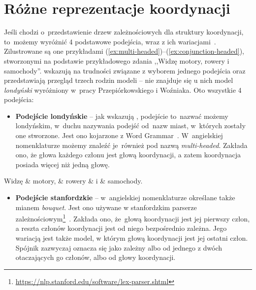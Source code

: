 \documentclass[licencjacka]{pracamgr_Kogni}
\begin{document}
    \section{Różne reprezentacje koordynacji}\label{sec:rozne-reprezentacje-koordynacji}
    Jeśli chodzi o~przedstawienie drzew zależnościowych dla struktury koordynacji, to~możemy wyróżnić 4 podstawowe podejścia, wraz z ich wariacjami~\citep{PopelEtAl2013, Przepiorkowski2023}.
    Zilustrowane są one przykładami (\ref{ex:multi-headed})--(\ref{ex:conjunction-headed}), stworzonymi na podstawie przykładowego zdania ,,Widzę motory, rowery i samochody''.
    \citet{PopelEtAl2013} wskazują na trudności związane z wyborem jednego podejścia oraz przedstawiają przegląd trzech rodzin modeli -- nie znajduje się u nich model \textit{londyński} wyróżniony w~pracy Przepiórkowskiego i Woźniaka.
    Oto wszystkie 4 podejścia:\\
    \begin{itemize}
        \item\textbf{Podejście londyńskie} -- jak wskazują \citet{Przepiorkowski2023}, podejście to~nazwać możemy londyńskim, w~duchu nazywania podejść od~nazw miast, w~których zostały one stworzone.
        Jest ono kojarzone z Word Grammar~\citep{Hudson1984, Hudson1990, Hudson2010}.
        W~angielskiej nomenklaturze możemy znaleźć je~również pod nazwą \textit{multi-headed}.
        Zakłada ono, że głowa każdego członu jest głową koordynacji, a zatem koordynacja posiada więcej niż jedną głowę.
    \end{itemize}
    \begin{exe}
        \ex
        \begin{dependency}[theme = simple, group style = bubble, segmented edge, edge vertical padding=0.5ex, edge unit distance=1.2ex, baseline =3em]
            \centering
            \begin{deptext}[column sep=1cm]
                Widzę \& motory, \& rowery \& i \& samochody. \\
            \end{deptext}
        \end{dependency}
        \label{ex:multi-headed}
    \end{exe}
    \begin{itemize}
        \item\textbf{Podejście stanfordzkie} -- w~angielskiej nomenklaturze określane także mianem \textit{bouquet}.
        Jest ono używane w stanfordzkim parserze zależnościowym\footnote{\url{https://nlp.stanford.edu/software/lex-parser.shtml}}~\citep{Marneffe2006}.
        Zakłada ono, że~głową koordynacji jest jej pierwszy człon, a reszta członów koordynacji jest od niego bezpośrednio zależna.
        Jego wariacją jest także model, w którym głową koordynacji jest jej ostatni człon.
        Spójnik zazwyczaj oznacza się jako zależny albo od jednego z dwóch otaczających go członów, albo od głowy koordynacji.
    \end{itemize}
\end{document}
